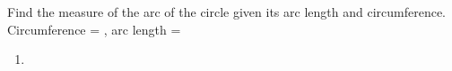 Find the measure of the arc of the circle given its arc length and circumference.
\newline
Circumference = , arc length = 
\newline
\begin{enumerate}
    \item
    \degree
{}
\end{enumerate}
